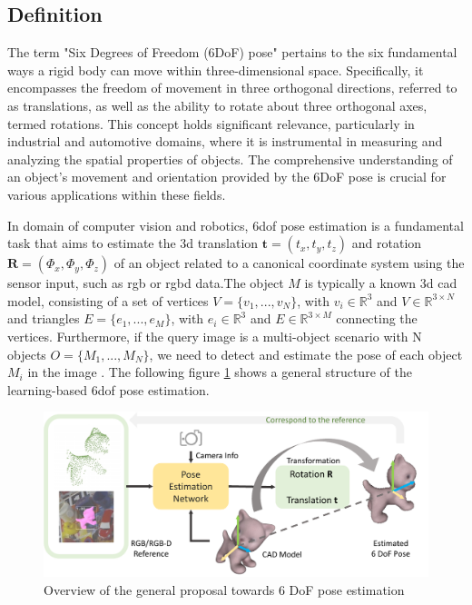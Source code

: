 \documentclass[12pt,DIV14,BCOR12mm,a4paper,footinclude=false,headinclude,parskip=half-,twoside,openright,cleardoublepage=empty,toc=index,bibliography=totoc,listof=totoc]{scrreprt}
\numberwithin{equation}{chapter}
\begin{document}
\subsection{Definition}
The term "Six Degrees of Freedom (6DoF) pose" pertains to the six fundamental ways a rigid body can move within three-dimensional space. Specifically, it encompasses the freedom of movement in three orthogonal directions, referred to as translations, as well as the ability to rotate about three orthogonal axes, termed rotations. This concept holds significant relevance, particularly in industrial and automotive domains, where it is instrumental in measuring and analyzing the spatial properties of objects. The comprehensive understanding of an object's movement and orientation provided by the 6DoF pose is crucial for various applications within these fields.

In domain of computer vision and robotics, \gls{6dof} pose estimation is a fundamental task that aims to estimate the \gls{3d} translation $\mathbf{t}=(t_{x} ,t_{y} ,t_{z} )$ and rotation $\mathbf{R}=(\Phi_{x} ,\Phi_{y} ,\Phi_{z} )$ of an object related to a canonical coordinate system using the sensor input, such as \gls{rgb} or \gls{rgbd} data.The object $M$ is typically a known \gls{3d} \gls{cad} model, consisting of a set of vertices $V=\{v_1,...,v_N\}$, with $v_i\in \mathbb{R}^3$ and $V\in \mathbb{R}^{3 \times N}$ and triangles $E=\{e_1,...,e_M\}$, with $e_i\in \mathbb{R}^3$ and $E\in \mathbb{R}^{3\times M}$ connecting the vertices. Furthermore, if the query image is a multi-object scenario with N objects $O=\{M_1,...,M_N\}$, we need to detect and estimate the pose of each object $M_i$ in the image \cite{Fabian_2021}. The following figure \ref{img:6d} shows a general structure of the learning-based \gls{6dof} pose estimation.

\begin{figure}[h]
	\centering
	\includegraphics[width=1.\textwidth]{img/6d.pdf}
	\caption{Overview of the general proposal towards 6 DoF pose estimation}
	\label{img:6d}
\end{figure}
\end{document}
